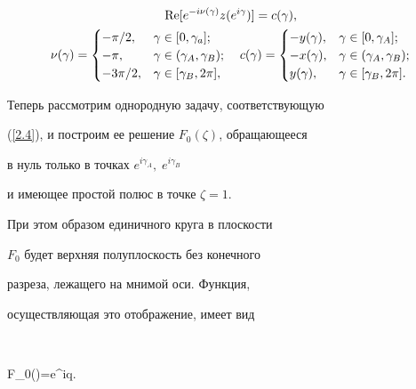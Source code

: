 \begin{gather}\label{2.4}


\re [e^{-i\nu(\gamma)}z(e^{i\gamma})]=c(\gamma), \\


%




\nu(\gamma)=\begin{cases}


-\pi/2, & \gamma\in [0,\gamma_{a}];\\


-\pi, & \gamma\in (\gamma_{A},\gamma_{B});\\


-3\pi/2, & \gamma\in [\gamma_{B},2\pi],


\end{cases}


\quad


c(\gamma)=\begin{cases}


-y(\gamma), & \gamma\in[0,\gamma_{A}];\\


-x(\gamma), & \gamma\in (\gamma_{A},\gamma_{B});\\


y(\gamma), & \gamma\in [\gamma_{B},2\pi].\notag


\end{cases}


\end{gather}





Теперь рассмотрим однородную задачу, соответствующую


(\ref{2.4}), и построим ее решение $F_{0}(\zeta)$, обращающееся


в нуль только в точках $e^{i\gamma_{A}},\;e^{i\gamma_{B}}\;$


и имеющее простой полюс в точке $\zeta=1$. 


При этом образом единичного круга в плоскости


$F_0$ будет верхняя полуплоскость без конечного 


разреза, лежащего на мнимой оси. Функция, 


осуществляющая это отображение, имеет вид


$$


F_{0}(\zeta)=e^{iq}.


